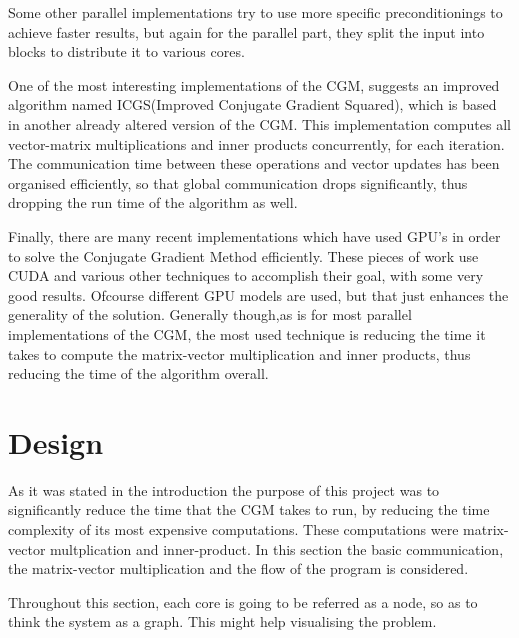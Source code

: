 \documentclass[12pt,a4paper]{article}
\begin{document}
Some other parallel implementations try to use more specific preconditionings to achieve faster results, but again for the parallel part, they split the input into blocks to distribute it to various cores\cite{adams1985m}\cite{adams1983m}. 

One of the most interesting implementations of the CGM, suggests an improved algorithm named ICGS(Improved Conjugate Gradient Squared), which is based in another already altered version of the CGM\cite{maheswaran1999mcgs}. This implementation computes all vector-matrix  multiplications and inner products concurrently, for each iteration. The communication time between these operations and vector updates has been organised efficiently, so that global communication drops significantly, thus dropping the run time of the algorithm as well\cite{yang2001improved}.

Finally, there are many recent implementations which have used GPU's in order to solve the Conjugate Gradient Method efficiently. These pieces of work use CUDA and various other techniques to accomplish their goal, with some very good results. Ofcourse different GPU models are used, but that just enhances the generality of the solution. Generally though,as is for most parallel implementations of the CGM, the most used technique is reducing the time it takes to compute the matrix-vector multiplication and inner products, thus reducing the time of the algorithm overall\cite{galiano2012gpu}\cite{wozniak2010parallel}.
\section{Design}
As it was stated in the introduction the purpose of this project was to significantly reduce the time that the CGM takes to run, by reducing the time complexity of its most expensive computations. These computations were matrix-vector multplication and inner-product. In this section the basic communication, the matrix-vector multiplication and the flow of the program is considered.

Throughout this section, each core is going to be referred as a node, so as to think the system as a graph. This might help visualising the problem.
\end{document}
